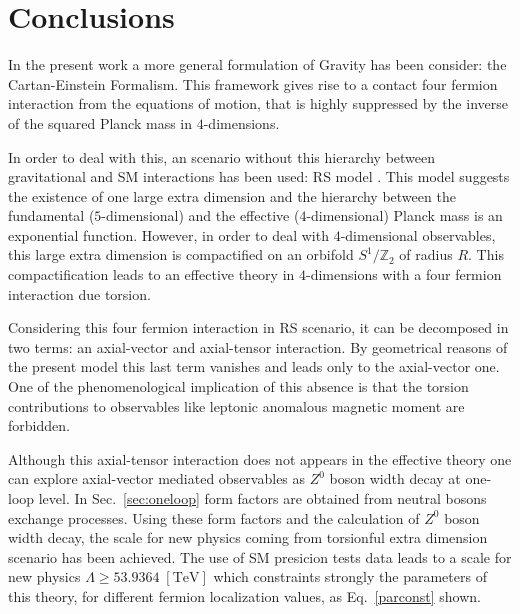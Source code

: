 \section{\label{sec:conclusions}Conclusions}

In the present work a more general formulation of Gravity has been consider: the Cartan-Einstein Formalism. This framework gives rise to a contact four fermion interaction from the equations of motion, that is highly suppressed by the inverse of the squared Planck mass in $4$-dimensions. 

In order to deal with this, an scenario without this hierarchy between gravitational and SM interactions has been used: RS model \cite{Randall:1999ee}. This model suggests the existence of one large extra dimension and the hierarchy between the fundamental ($5$-dimensional) and the effective ($4$-dimensional) Planck mass is an exponential function. However, in order to deal with $4$-dimensional observables, this large extra dimension is compactified on an orbifold $S^1/\mathbb{Z}_2$ of radius $R$. This compactification leads to an effective theory in $4$-dimensions with a four fermion interaction due torsion. 

Considering this four fermion interaction in RS scenario, it can be decomposed in two terms: an axial-vector and axial-tensor interaction. By geometrical reasons of the present model this last term vanishes and leads only to the axial-vector one. One of the phenomenological implication of this absence is that the torsion contributions to observables like leptonic anomalous magnetic moment are forbidden. 

Although this axial-tensor interaction does not appears in the effective theory one can explore axial-vector mediated observables as $Z^0$ boson width decay at one-loop level. In Sec.~\ref{sec:oneloop} form factors are obtained from neutral bosons exchange processes. Using these form factors and the calculation of $Z^0$ boson width decay, the scale for new physics coming from torsionful extra dimension scenario has been achieved. The use of SM presicion tests data leads to a scale for new physics $ \Lambda \geq 53.9364\;[\text{TeV}]$ which constraints strongly the parameters of this theory, for different fermion localization values, as Eq.~\eqref{parconst} shown.
